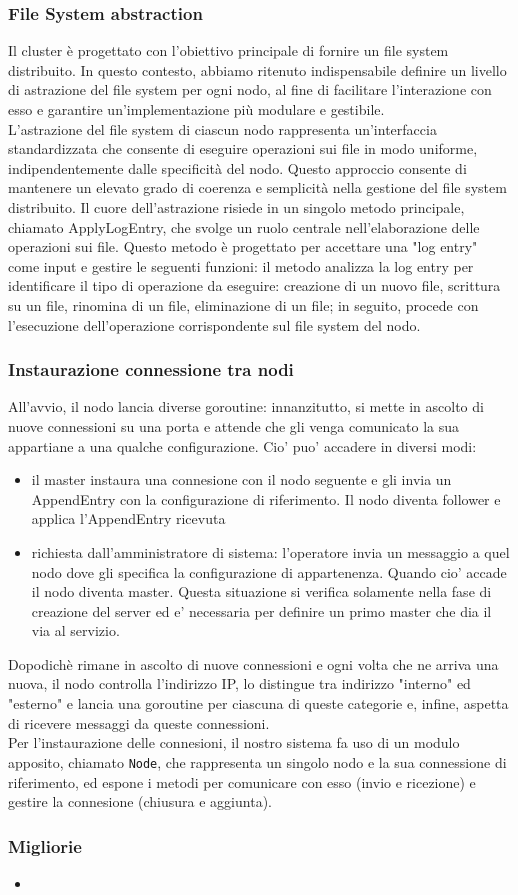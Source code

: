 \subsubsection{File System abstraction}
Il cluster è progettato con l'obiettivo principale di fornire un file system distribuito. 
In questo contesto, abbiamo ritenuto indispensabile definire un livello di astrazione del file 
system per ogni nodo, al fine di facilitare l'interazione con esso e garantire un'implementazione 
più modulare e gestibile.\\
L'astrazione del file system di ciascun nodo rappresenta un'interfaccia standardizzata che consente di eseguire operazioni sui 
file in modo uniforme, indipendentemente dalle specificità del nodo. Questo approccio consente di mantenere
un elevato grado di coerenza e semplicità nella gestione del file system distribuito.
Il cuore dell'astrazione risiede in un singolo metodo principale, chiamato ApplyLogEntry, che svolge un ruolo centrale nell'elaborazione
delle operazioni sui file. Questo metodo è progettato per accettare una "log entry" come input e 
gestire le seguenti funzioni: il metodo analizza la log entry per identificare il tipo di operazione da eseguire: creazione 
di un nuovo file, scrittura su un file, rinomina di un file, eliminazione di un file; in seguito, procede con 
l'esecuzione dell'operazione corrispondente sul file system del nodo.

\subsubsection{Instaurazione connessione tra nodi}
All'avvio, il nodo lancia diverse goroutine: innanzitutto, si mette in ascolto di nuove connessioni 
su una porta e attende che gli venga comunicato la sua appartiane a una qualche configurazione.
Cio' puo' accadere in diversi modi:
\begin{itemize}
    \item il master instaura una connesione con il nodo seguente e gli invia un AppendEntry con la
    configurazione di riferimento. Il nodo diventa follower e applica l'AppendEntry ricevuta

    \item richiesta dall'amministratore di sistema: l'operatore invia un messaggio a quel nodo dove 
    gli specifica la configurazione di appartenenza. Quando cio' accade il nodo diventa master.
    Questa situazione si verifica solamente nella fase di creazione del server ed e' necessaria per 
    definire un primo master che dia il via al servizio.
\end{itemize}
Dopodichè rimane in ascolto di nuove connessioni e ogni volta che ne arriva una nuova, il nodo 
controlla l'indirizzo IP, lo distingue tra indirizzo "interno" ed "esterno" e lancia una goroutine 
per ciascuna di queste categorie e, infine, aspetta di ricevere messaggi da queste connessioni. \\
Per l'instaurazione delle connesioni, il nostro sistema fa uso di un modulo apposito, chiamato 
\texttt{Node}, che rappresenta un singolo nodo e la sua connessione di riferimento, ed espone i 
metodi per comunicare con esso (invio e ricezione) e gestire la connesione (chiusura e aggiunta).

\subsubsection{Migliorie}
\begin{itemize}
    \item 
\end{itemize}
